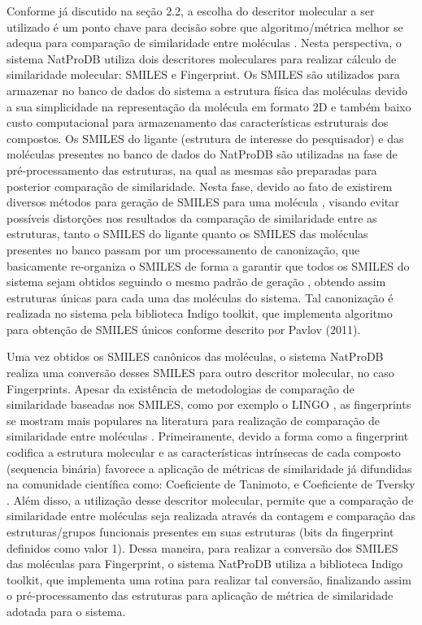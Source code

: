  Conforme já discutido na seção 2.2, a escolha do descritor molecular a ser utilizado é um ponto chave para decisão sobre que algoritmo/métrica melhor se adequa para comparação de similaridade entre moléculas \cite{todeschini2008handbook}. Nesta perspectiva, o sistema NatProDB utiliza dois descritores moleculares para realizar cálculo de similaridade molecular: SMILES e Fingerprint. Os SMILES são utilizados para armazenar no banco de dados do sistema a estrutura física das moléculas devido a sua simplicidade na representação da molécula em formato 2D e também baixo custo computacional para armazenamento das características estruturais dos compostos. Os SMILES do ligante (estrutura de interesse do pesquisador) e das moléculas presentes no banco de dados do NatProDB são utilizadas na fase de pré-processamento das estruturas, na qual as mesmas são preparadas para posterior comparação de similaridade. Nesta fase, devido ao fato de existirem diversos métodos para geração de SMILES para uma molécula \cite{kumar2012}, visando evitar possíveis distorções nos resultados da comparação de similaridade entre as estruturas, tanto o SMILES do ligante quanto os SMILES das moléculas presentes no banco passam por um processamento de canonização, que basicamente re-organiza o SMILES de forma a garantir que todos os SMILES do sistema sejam obtidos seguindo o mesmo padrão de geração \cite{kumar2012}, obtendo assim estruturas únicas para cada uma das moléculas do sistema. Tal canonização é realizada no sistema pela biblioteca Indigo toolkit, que implementa algoritmo para obtenção de SMILES únicos conforme descrito por Pavlov (2011).

Uma vez obtidos os SMILES canônicos das moléculas, o sistema NatProDB realiza uma conversão    
desses SMILES para outro descritor molecular, no caso Fingerprints. Apesar da existência de metodologias de comparação de similaridade baseadas nos SMILES, como por exemplo o LINGO \cite{vidal2005lingo}, as fingerprints se mostram mais populares na literatura para realização de comparação de similaridade entre moléculas \cite{varnek2011fragment}. Primeiramente, devido a forma como a fingerprint codifica a estrutura molecular e as características intrínsecas de cada composto (sequencia binária) favorece a aplicação de métricas de similaridade já difundidas na comunidade científica como: Coeficiente de Tanimoto, e Coeficiente de Tversky \cite{willett2003similarity}. Além disso, a utilização desse  descritor molecular, permite que a comparação de similaridade entre moléculas seja realizada através da contagem e comparação das estruturas/grupos funcionais presentes em suas estruturas (bits da fingerprint definidos como valor 1). Dessa maneira, para realizar  a conversão dos SMILES das moléculas para Fingerprint, o sistema NatProDB utiliza a biblioteca Indigo toolkit, que implementa uma rotina para  realizar tal conversão, finalizando assim o pré-processamento das estruturas para aplicação de métrica de similaridade adotada para o sistema.

